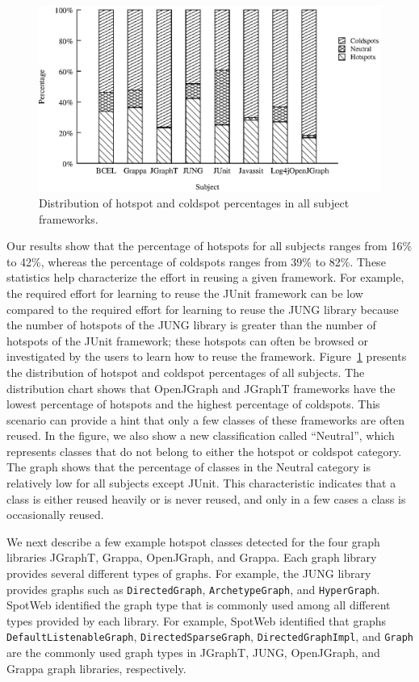 \documentclass[conference]{IEEEtran}
\newcommand{\CodeIn}[1]{{\small\texttt{#1}}}
\begin{document}
\begin{figure}[t]
\centering
\includegraphics[scale=0.65,clip]{hotanddeadstats.eps}
\caption{\label{fig:hotdeadstats} Distribution of hotspot and coldspot percentages in all subject frameworks.} 
\end{figure}

Our results show that the percentage of hotspots for all subjects
ranges from 16\% to 42\%, whereas the percentage of coldspots ranges
from 39\% to 82\%. These statistics help characterize the effort in reusing 
a given framework. For example, the required effort for learning to reuse 
the JUnit framework can be low compared to the required effort for learning to reuse
the JUNG library because the number of hotspots of the JUNG library is
greater than the number of hotspots of the JUnit framework; these hotspots can 
often be browsed or investigated by the users to learn how to reuse the framework.
Figure~\ref{fig:hotdeadstats} presents the
distribution of hotspot and coldspot percentages of all subjects. 
The distribution chart shows that OpenJGraph and JGraphT frameworks
have the lowest percentage of hotspots and the highest percentage of
coldspots. This scenario can provide a hint that only a few classes of these
frameworks are often reused. In the figure, we also show a new classification called
``Neutral'', which represents classes that do not belong to either
the hotspot or coldspot category. The graph shows that the
percentage of classes in the Neutral category is relatively low for
all subjects except JUnit. This characteristic indicates that a class
is either reused heavily or is never reused, and only in a few cases
a class is occasionally reused.

We next describe a few example hotspot classes detected for the four graph libraries
JGraphT, Grappa, OpenJGraph, and Grappa. Each graph library provides several
different types of graphs. For example, the JUNG library provides 
graphs such as \CodeIn{DirectedGraph}, \CodeIn{ArchetypeGraph},
and \CodeIn{HyperGraph}.  SpotWeb identified the graph type that is commonly
used among all different types provided by each library. For example, SpotWeb
identified that graphs \CodeIn{DefaultListenableGraph}, \CodeIn{DirectedSparseGraph}, \CodeIn{DirectedGraphImpl},
and \CodeIn{Graph} are the commonly used graph types in JGraphT, JUNG, OpenJGraph, and Grappa
graph libraries, respectively. 
\end{document}
